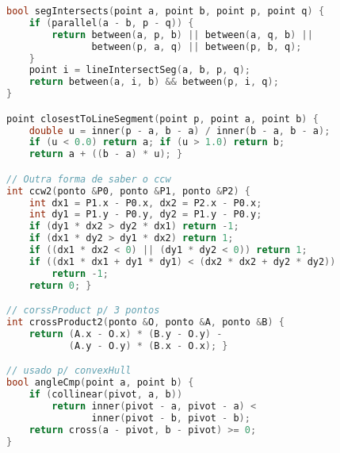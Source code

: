 \begin{lstlisting}[language=C++, title=Parte 2: Operações (cont.)]
bool segIntersects(point a, point b, point p, point q) {
	if (parallel(a - b, p - q)) {
		return between(a, p, b) || between(a, q, b) || 
               between(p, a, q) || between(p, b, q); 
	}
	point i = lineIntersectSeg(a, b, p, q);
	return between(a, i, b) && between(p, i, q);
}

point closestToLineSegment(point p, point a, point b) {
	double u = inner(p - a, b - a) / inner(b - a, b - a);
	if (u < 0.0) return a; if (u > 1.0) return b;
	return a + ((b - a) * u); }

// Outra forma de saber o ccw
int ccw2(ponto &P0, ponto &P1, ponto &P2) {
    int dx1 = P1.x - P0.x, dx2 = P2.x - P0.x;
    int dy1 = P1.y - P0.y, dy2 = P1.y - P0.y;
    if (dy1 * dx2 > dy2 * dx1) return -1;
    if (dx1 * dy2 > dy1 * dx2) return 1;
    if ((dx1 * dx2 < 0) || (dy1 * dy2 < 0)) return 1;
    if ((dx1 * dx1 + dy1 * dy1) < (dx2 * dx2 + dy2 * dy2))
        return -1;
    return 0; }

// corssProduct p/ 3 pontos
int crossProduct2(ponto &O, ponto &A, ponto &B) {
	return (A.x - O.x) * (B.y - O.y) - 
	       (A.y - O.y) * (B.x - O.x); }

// usado p/ convexHull
bool angleCmp(point a, point b) {
	if (collinear(pivot, a, b))
		return inner(pivot - a, pivot - a) <
		       inner(pivot - b, pivot - b);
	return cross(a - pivot, b - pivot) >= 0;
}
\end{lstlisting}